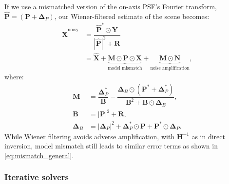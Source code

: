 If we use a mismatched version of the on-axis PSF's Fourier transform, \ie $\bm{\hat{P}} = (\bm{P}+ \bm{\Delta}_P)$, 
our Wiener-filtered estimate of the scene becomes:
\begin{align}
    \bm{\hat{X}}^{\text{noisy}} &= \dfrac{\bm{\hat{P}}^* \odot \bm{Y}}{ |\bm{\hat{P}}|^2 + \bm{R}} \nonumber\\
    &= \bm{\hat{X}} + \underbrace{\bm{M} \odot \bm{P} \odot  \bm{X}}_{\text{model mismatch}} + \underbrace{\bm{M} \odot \bm{N}}_{\text{noise amplification}}, \label{eq:noisy_wiener}
\end{align}
where:
\begin{align}
\bm{M} &= \dfrac{\bm{\Delta}_P^*}{\bm{B}} - \dfrac{\bm{\Delta}_B \odot (\bm{P}^* + \bm{\Delta}_P^*)}{\bm{B}^2 + \bm{B} \odot \bm{\Delta}_B}, \\
\bm{B} &= |\bm{P}|^2 + \bm{R},\\
\bm{\Delta}_B &= |\bm{\Delta}_P|^2 + \bm{\Delta}_P^* \odot \bm{P} + \bm{P}^*\odot\bm{\Delta}_P.
\end{align}
While Wiener filtering avoids adverse amplification, \ie with $\bm{H}^{-1}$ as in direct inversion,
model mismatch still leads to similar error terms as shown in \cref{eq:mismatch_general}.

\subsubsection{Iterative solvers} 
\label{sec:error_iterative}

